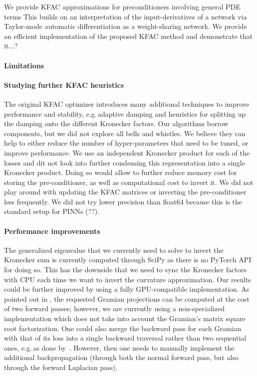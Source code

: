 
We provide KFAC approximations for preconditioners involving general PDE terms
This builds on an interpretation of the input-derivatives of a network via Taylor-mode automatic differentiation as a weight-sharing network. 
We provide an efficient implementation of the proposed KFAC method and demonstrate that it...? 

\paragraph{Limitations}
\paragraph{Studying further KFAC heuristics} The original KFAC optimizer introduces many additional techniques to improve performance and stability, e.g.\,adaptive damping and heuristics for splitting up the damping onto the different Kronecker factors.
Our algorithms borrow components, but we did not explore all bells and whistles.
We believe they can help to either reduce the number of hyper-parameters that need to be tuned, or improve performance.
We use an independent Kronecker product for each of the losses and dit not look into further condensing this representation into a single Kronecker product.
Doing so would allow to further reduce memory cost for storing the pre-conditioner, as well as computational cost to invert it.
We did not play around with updating the KFAC matrices or inverting the pre-conditioner less frequently.
We did not try lower precision than float64 because this is the standard setup for PINNs (??).

\paragraph{Performance improvements} The generalized eigenvalue that we currently need to solve to invert the Kronecker sum is currently computed through SciPy as there is no PyTorch API for doing so. This has the downside that we need to sync the Kronecker factors with CPU each time we want to invert the curvature approximation. Our results could be further improved by using a fully GPU-compatible implementation.
As pointed out in \citep{martens2015optimizing}, the requested Gramian projections can be computed at the cost of two forward passes; however, we are currently using a non-specialized implementation which does not take into account the Gramian's matrix square root factorization.
One could also merge the backward pass for each Gramian with that of its loss into a single backward traversal rather than two sequential ones, e.g.\,as done by~\cite{dangel2020backpack}.
However, then one needs to manually implement the additional backpropagation (through both the normal forward pass, but also through the forward Laplacian pass).

